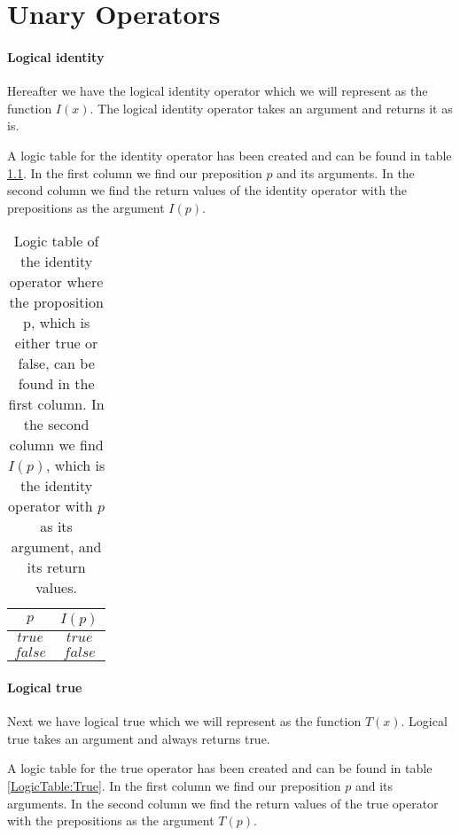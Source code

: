 \appendix

\chapter{Unary Operators}
\label{appendix:Unary_Operators}

    
    
    \subsubsection{Logical identity}
        
        Hereafter we have the logical identity operator which we will represent as the function $I(x)$. The logical identity operator takes an argument and returns it as is. 
        
        A logic table for the identity operator has been created and can be found in table \ref{LogicTable:Identity}. In the first column we find our preposition $p$ and its arguments. In the second column we find the return values of the identity operator with the prepositions as the argument $I(p)$.
        
        \begin{table}[h!]
            \centering
            \begin{tabular}{|c|c|}
            	\hline
            	  $p$   & $I(p)$  \\ \hline
            	$true$  & $true$  \\ \hline
            	$false$ & $false$ \\ \hline
            \end{tabular}
            \caption{Logic table of the identity operator where the proposition p, which is either true or false, can be found in the first column. In the second column we find $I(p)$, which is the identity operator with $p$ as its argument, and its return values.}
            \label{LogicTable:Identity}
        \end{table}
        
    \subsubsection{Logical true}
        
        Next we have logical true which we will represent as the function $T(x)$. Logical true takes an argument and always returns true.
        
        A logic table for the true operator has been created and can be found in table \ref{LogicTable:True}. In the first column we find our preposition $p$ and its arguments. In the second column we find the return values of the true operator with the prepositions as the argument $T(p)$.
        
